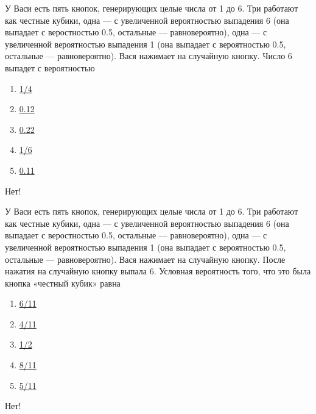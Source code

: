 \documentclass[t]{beamer}
\begin{document}
 \begin{frame} \label{14-No} 
\begin{block}{14} 

У Васи есть пять кнопок, генерирующих целые числа от 1 до 6. Три работают как честные кубики, одна — с увеличенной вероятностью выпадения 6 (она выпадает с веростностью 0.5, остальные — равновероятно), одна — с увеличенной вероятностью выпадения 1 (она выпадает с вероятностью 0.5, остальные — равновероятно). Вася нажимает на случайную кнопку. Число 6 выпадет с вероятностью
  


 \end{block} 
\begin{enumerate} 
\item[] \hyperlink{14-No}{\beamergotobutton{}  1/4 }
\item[] \hyperlink{14-No}{\beamergotobutton{}  0.12 }
\item[] \hyperlink{14-Yes}{\beamergotobutton{}  0.22 }
\item[] \hyperlink{14-No}{\beamergotobutton{}  1/6 }
\item[] \hyperlink{14-No}{\beamergotobutton{}  0.11 }
\end{enumerate} 

 \alert{Нет!} 
\end{frame} 


 \begin{frame} \label{15-No} 
\begin{block}{15} 

У Васи есть пять кнопок, генерирующих целые числа от 1 до 6. Три работают как честные кубики, одна — с увеличенной вероятностью выпадения 6 (она выпадает с веростностью 0.5, остальные — равновероятно), одна — с увеличенной вероятностью выпадения 1 (она выпадает с вероятностью 0.5, остальные — равновероятно). Вася нажимает на случайную кнопку. После нажатия на случайную кнопку выпала 6. Условная вероятность того, что это была кнопка «честный кубик» равна


 \end{block} 
\begin{enumerate} 
\item[] \hyperlink{15-No}{\beamergotobutton{}  6/11 }
\item[] \hyperlink{15-No}{\beamergotobutton{}  4/11 }
\item[] \hyperlink{15-No}{\beamergotobutton{}  1/2 }
\item[] \hyperlink{15-No}{\beamergotobutton{}  8/11 }
\item[] \hyperlink{15-Yes}{\beamergotobutton{}  5/11 }
\end{enumerate} 

 \alert{Нет!} 
\end{frame} 
\end{document}
